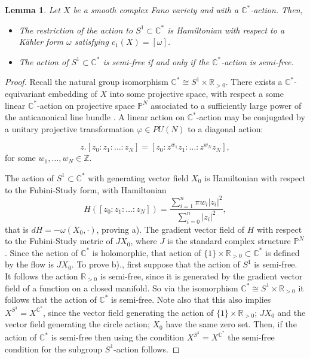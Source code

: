 \documentclass[12pt]{article}
\newtheorem{lemma}[theorem]{Lemma}
\begin{document}
\begin{lemma} \label{algebraicrestriction}
Let $X$ be a smooth complex Fano variety and with a $\mathbb{C}^*$-action. Then, \begin{itemize} \item[a).] The restriction of the action to $S^1 \subset \mathbb{C}^*$ is Hamiltonian with respect to a K\"{a}hler form $\omega$ satisfying $c_{1}(X)= [\omega]$.
\item[b).] The action of $S^1 \subset \mathbb{C}^*$ is semi-free if and only if the  $\mathbb{C}^*$-action is semi-free.
\end{itemize}
\end{lemma}
\begin{proof}
Recall the natural group isomorphism  $\mathbb{C}^* \cong S^1 \times \mathbb{R}_{>0}$. There exists a $\mathbb{C}^*$-equivariant embedding of $X$ into some projective space, with respect a some linear $\mathbb{C}^*$-action on projective space $\mathbb{P}^{N}$ associated to a sufficiently large power of the anticanonical line bundle \cite[Lemma 5.3]{GLS}. A linear action on $\mathbb{C}^*$-action may be conjugated by a unitary projective transformation $\varphi \in PU(N)$ to a diagonal action: 

$$z.[z_0 :  z_1 : \ldots : z_N] =[z_0 : z^{w_{1}} z_1 : \ldots : z^{w_{N}} z_N],$$ for some $w_1,\ldots,w_N \in \mathbb{Z}$. 

The action of $S^1 \subset \mathbb{C}^*$ with generating vector field $X_{0}$ is Hamiltonian with respect to the Fubini-Study form, with Hamiltonian $$H ([z_0 :  z_1 : \ldots : z_N]) = \frac{\sum_{i=1}^{n} \pi w_i |z_i|^2}{\sum_{i=0}^{n} |z_i|^2},$$ that is $dH = -\omega(X_0,\cdot)$, proving a). The gradient vector field of $H$ with respect to the Fubini-Study metric of $JX_0$, where $J$ is the standard complex structure $\mathbb{P}^N$. Since the action of $\mathbb{C}^*$ is holomorphic,  that action of $\{1\} \times \mathbb{R}_{>0} \subset \mathbb{C}^*$ is defined by the flow is $JX_0$. To prove b)., first suppose that the action of $S^1$ is semi-free.  It follows the action $\mathbb{R}_{>0}$ is semi-free, since it is generated by the gradient vector field of a function on a closed manifold. So via the isomorphism $\mathbb{C}^* \cong S^1 \times \mathbb{R}_{>0}$ it follows that the action of $\mathbb{C}^*$ is semi-free. Note also that this also implies $X^{S^1} = X^{\mathbb{C}^*}$, since the vector field generating the action of  $\{1\} \times \mathbb{R}_{>0}$;  $JX_0$ and the vector field generating the circle action; $X_0$ have the same zero set. Then, if the action of $\mathbb{C}^*$ is semi-free then using the condition $X^{S^1} = X^{\mathbb{C}^*}$ the semi-free condition for the subgroup $S^1$-action follows. \end{proof}
\end{document}
